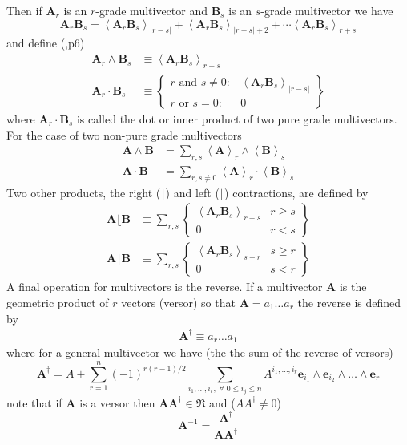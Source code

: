 \documentclass[12pt,twoside,openright]{memoir}
\newcommand{\bm}[1]{\boldsymbol{#1}}
\newcommand{\bfrac}[2]{\displaystyle\frac{#1}{#2}}
\newcommand{\llt}{\left <}
\newcommand{\rgt}{\right >}
\newcommand{\abs}[1]{\left |{#1}\right |}
\newcommand{\W}{\wedge}
\newcommand{\R}{\dagger}
\newcommand{\proj}[2]{\llt {#1} \rgt_{#2}}
\newcommand{\braces}[1]{\left \{ {#1} \right \}}
\newcommand{\eb}{\bm{e}}
\begin{document}
Then if $\bm{A}_{r}$ is an $r$-grade multivector and $\bm{B}_{s}$ is an $s$-grade multivector we have
   \begin{equation}
      \bm{A}_{r}\bm{B}_{s} = \proj{\bm{A}_{r}\bm{B}_{s}}{\abs{r-s}}+\proj{\bm{A}_{r}\bm{B}_{s}}{\abs{r-s}+2}+\cdots
                             \proj{\bm{A}_{r}\bm{B}_{s}}{r+s}
   \end{equation}
and define (\cite{Hestenes},p6)
   \begin{align}
      \bm{A}_{r}\W\bm{B}_{s} &\equiv \proj{\bm{A}_{r}\bm{B}_{s}}{r+s} \\
      \bm{A}_{r}\cdot\bm{B}_{s} &\equiv \braces{ \begin{array}{cc}
      r\mbox{ and }s \ne 0: & \proj{\bm{A}_{r}\bm{B}_{s}}{\abs{r-s}}  \\
      r\mbox{ or }s = 0: & 0 \end{array}}
   \end{align}
where $\bm{A}_{r}\cdot\bm{B}_{s}$ is called the dot or inner product of
two pure grade multivectors.  For the case of two non-pure grade multivectors
   \begin{align}
      \bm{A}\W\bm{B} &= \sum_{r,s}\proj{\bm{A}}{r}\W\proj{\bm{B}}{{s}} \\
      \bm{A}\cdot\bm{B} &= \sum_{r,s\ne 0}\proj{\bm{A}}{r}\cdot\proj{\bm{B}}{{s}}
   \end{align}
Two other products, the right ($\rfloor$) and left ($\lfloor$) contractions, are defined by
   \begin{align}
      \bm{A}\lfloor\bm{B} &\equiv \sum_{r,s}\braces{\begin{array}{cc} \proj{\bm{A}_r\bm{B}_{s}}{r-s} & r \ge s \\
                                                  0                                               & r < s \end{array}}  \\
      \bm{A}\rfloor\bm{B} &\equiv \sum_{r,s}\braces{\begin{array}{cc} \proj{\bm{A}_{r}\bm{B}_{s}}{s-r} & s \ge r \\
                                                  0                                               & s < r\end{array}}
   \end{align}
A final operation for multivectors is the reverse.  If a multivector $\bm{A}$ is the geometric product of $r$ vectors (versor)
so that $\bm{A} = a_{1}\dots a_{r}$ the reverse is defined by
   \begin{align}
      \bm{A}^{\R} \equiv a_{r}\dots a_{1}
   \end{align}
where for a general multivector we have (the the sum of the reverse of versors)
   \begin{equation}
      \bm{A}^{\R} = A + \sum_{r=1}^{n}(-1)^{r(r-1)/2}\sum_{i_{1},\dots,i_{r},\;\forall\; 0\le i_{j} \le n} A^{i_{1},\dots,i_{r}}\eb_{i_{1}}\W \eb_{i_{2}}\W\dots\W \eb_{r}
   \end{equation}
note that if $\bm{A}$ is a versor then $\bm{A}\bm{A}^{\R}\in\Re$ and ($AA^{\R} \ne 0$)
   \begin{equation}
      \bm{A}^{-1} = \bfrac{\bm{A}^{\R}}{\bm{AA}^{\R}}
   \end{equation}
\end{document}
